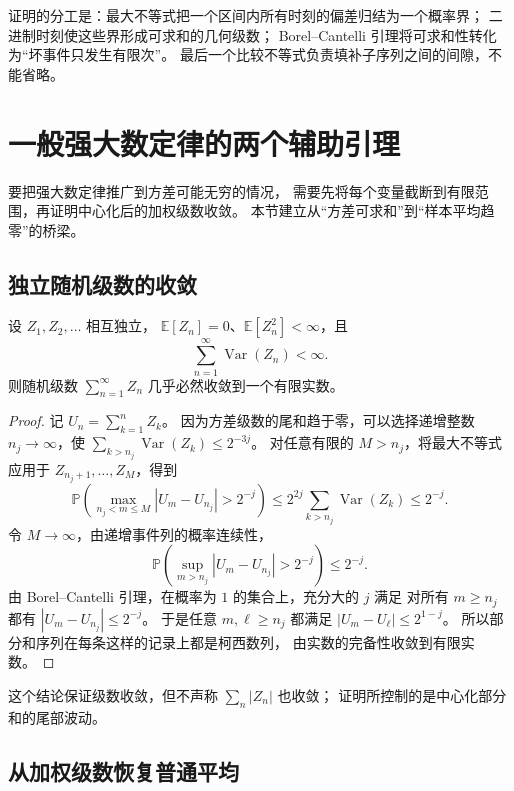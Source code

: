 \documentclass[UTF8,12pt,a4paper,fontset=fandol]{ctexart}
\begin{document}
证明的分工是：最大不等式把一个区间内所有时刻的偏差归结为一个概率界；
二进制时刻使这些界形成可求和的几何级数；
Borel--Cantelli 引理将可求和性转化为“坏事件只发生有限次”。
最后一个比较不等式负责填补子序列之间的间隙，不能省略。

\section{一般强大数定律的两个辅助引理}
\label{sec:lln-series-tools}

要把强大数定律推广到方差可能无穷的情况，
需要先将每个变量截断到有限范围，再证明中心化后的加权级数收敛。
本节建立从“方差可求和”到“样本平均趋零”的桥梁。

\subsection{独立随机级数的收敛}

\begin{lemma}[方差可求和保证中心化级数收敛]
\label{lem:lln-series-convergence}
设 $Z_1,Z_2,\ldots$ 相互独立，
$\mathbb E[Z_n]=0$、$\mathbb E[Z_n^2]<\infty$，且
\[
  \sum_{n=1}^\infty\operatorname{Var}(Z_n)<\infty.
\]
则随机级数 $\sum_{n=1}^\infty Z_n$ 几乎必然收敛到一个有限实数。
\end{lemma}

\begin{proof}
记 $U_n=\sum_{k=1}^nZ_k$。
因为方差级数的尾和趋于零，可以选择递增整数 $n_j\to\infty$，使
$\sum_{k>n_j}\operatorname{Var}(Z_k)\leq2^{-3j}$。
对任意有限的 $M>n_j$，将最大不等式应用于
$Z_{n_j+1},\ldots,Z_M$，得到
\[
  \mathbb P\left(
    \max_{n_j<m\leq M}|U_m-U_{n_j}|>2^{-j}
  \right)
  \leq 2^{2j}\sum_{k>n_j}\operatorname{Var}(Z_k)
  \leq2^{-j}.
\]
令 $M\to\infty$，由递增事件列的概率连续性，
\[
  \mathbb P\left(
    \sup_{m>n_j}|U_m-U_{n_j}|>2^{-j}
  \right)\leq2^{-j}.
\]
由 Borel--Cantelli 引理，在概率为 $1$ 的集合上，充分大的 $j$ 满足
对所有 $m\geq n_j$ 都有 $|U_m-U_{n_j}|\leq2^{-j}$。
于是任意 $m,\ell\geq n_j$ 都满足
$|U_m-U_\ell|\leq2^{1-j}$。
所以部分和序列在每条这样的记录上都是柯西数列，
由实数的完备性收敛到有限实数。
\end{proof}

这个结论保证级数收敛，但不声称 $\sum_n|Z_n|$ 也收敛；
证明所控制的是中心化部分和的尾部波动。

\subsection{从加权级数恢复普通平均}
\end{document}
